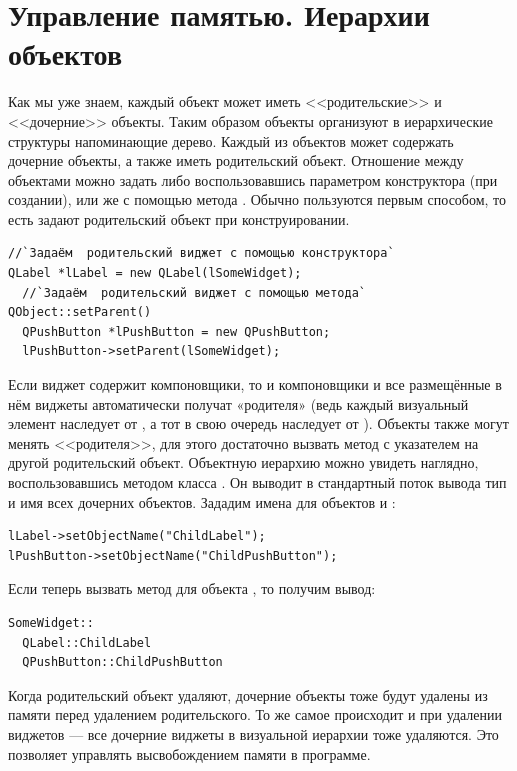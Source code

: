 \section[Управление памятью. Иерархии объектов]{Управление памятью. Иерархии объектов}
Как мы уже знаем, каждый объект может иметь <<родительские>> и <<дочерние>> объекты.
Таким образом объекты организуют в иерархические структуры напоминающие дерево. Каждый из объектов может содержать
дочерние объекты, а также иметь родительский объект. Отношение между объектами можно задать либо воспользовавшись
параметром конструктора (при создании), или же с помощью метода . Обычно пользуются первым
способом, то есть задают родительский объект при конструировании.
\begin{lstlisting}
//`Задаём  родительский виджет с помощью конструктора`
QLabel *lLabel = new QLabel(lSomeWidget);
  //`Задаём  родительский виджет с помощью метода` QObject::setParent()
  QPushButton *lPushButton = new QPushButton;
  lPushButton->setParent(lSomeWidget);
\end{lstlisting}

Если виджет содержит компоновщики, то и компоновщики и все размещённые в нём виджеты автоматически получат «родителя»
(ведь каждый визуальный элемент наследует от , а тот в свою очередь наследует от
). Объекты также могут менять <<родителя>>, для этого достаточно
вызвать метод  с указателем на другой родительский объект. Объектную иерархию можно увидеть наглядно, воспользовавшись методом  класса
. Он выводит в стандартный поток вывода тип и имя всех дочерних объектов. Зададим имена для объектов
 и :
\begin{lstlisting}
lLabel->setObjectName("ChildLabel");
lPushButton->setObjectName("ChildPushButton");
\end{lstlisting}

Если теперь вызвать метод  для объекта , то получим вывод:
\begin{lstlisting}
SomeWidget:: 
  QLabel::ChildLabel 
  QPushButton::ChildPushButton 
\end{lstlisting}

Когда родительский объект удаляют, дочерние объекты тоже будут удалены из памяти перед удалением родительского. То же
самое происходит и при удалении виджетов --- все дочерние виджеты в визуальной иерархии тоже удаляются. Это позволяет
управлять высвобождением памяти в программе.

